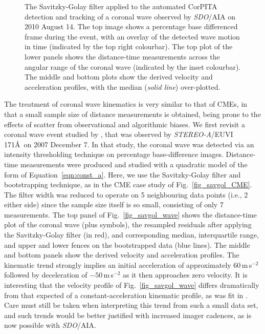 \documentclass[referee]{aa}
\begin{document}
\begin{figure}[!t]
\caption{The Savitzky-Golay filter applied to the automated CorPITA detection and tracking of a coronal wave observed by \emph{SDO}/AIA on 2010 August 14. The top image shows a percentage base differenced frame during the event, with an overlay of the detected wave motion in time (indicated by the top right colourbar). The top plot of the lower panels shows the distance-time measurements across the angular range of the coronal wave (indicated by the inset colourbar). The middle and bottom plots show the derived velocity and acceleration profiles, with the median (\emph{solid line}) over-plotted.}
\label{fig_savgol_wave_CorPITA}
\end{figure}

The treatment of coronal wave kinematics is very similar to that of CMEs, in that a small sample size of distance measurements is obtained, being prone to the effects of scatter from observational and algorithmic biases. We first revisit a coronal wave event studied by \citet{2011A&A...531A..42L}, that was observed by \emph{STEREO-A}/EUVI 171\AA\ on 2007 December 7. In that study, the coronal wave was detected via an intensity thresholding technique on percentage base-difference images. Distance-time measurements were produced and studied with a quadratic model of the form of Equation~\ref{eqn:const_a}. Here, we use the Savitzky-Golay filter and bootstrapping technique, as in the CME case study of Fig.~\ref{fig_savgol_CME}. The filter width was reduced to operate on 5 neighbouring data points (i.e., 2 either side) since the sample size itself is so small, consisting of only 7 measurements. The top panel of Fig.~\ref{fig_savgol_wave} shows the distance-time plot of the coronal wave (plus symbols), the resampled residuals after applying the Savitzky-Golay filter (in red), and corresponding median, interquartile range, and upper and lower fences on the bootstrapped data (blue lines). The middle and bottom panels show the derived velocity and acceleration profiles. The kinematic trend strongly implies an initial acceleration of approximately 60\,m\,s$^{-2}$ followed by deceleration of $-50$\,m\,s$^{-2}$ as it then approaches zero velocity. It is interesting that the velocity profile of Fig.~\ref{fig_savgol_wave} differs dramatically from that expected of a constant-acceleration kinematic profile, as was fit in \citet{2011A&A...531A..42L}. Care must still be taken when interpreting this trend from such a small data set, and such trends would be better justified with increased imager cadences, as is now possible with \emph{SDO}/AIA.
\end{document}
